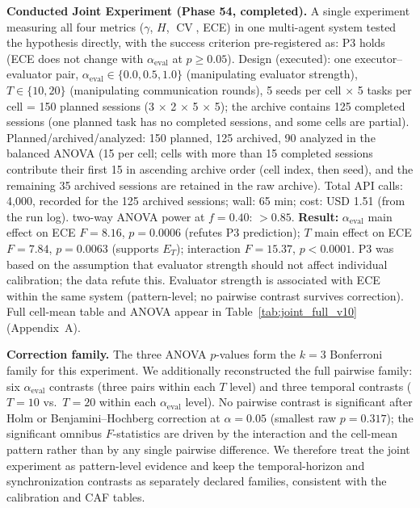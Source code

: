 \documentclass[11pt]{article}
\DeclareMathOperator{\CV}{CV}
\begin{document}
\textbf{Conducted Joint Experiment (Phase 54, completed).} A single experiment measuring all four metrics ($\gamma$, $H$, $\CV$, ECE) in one multi-agent system tested the hypothesis directly, with the success criterion pre-registered as: P3 holds (ECE does not change with $\alpha_{\text{eval}}$ at $p \geq 0.05$). Design (executed): one executor--evaluator pair, $\alpha_{\text{eval}} \in \{0.0, 0.5, 1.0\}$ (manipulating evaluator strength), $T \in \{10, 20\}$ (manipulating communication rounds), 5 seeds per cell $\times$ 5 tasks per cell = 150 planned sessions (3 $\times$ 2 $\times$ 5 $\times$ 5); the archive contains 125 completed sessions (one planned task has no completed sessions, and some cells are partial). Planned/archived/analyzed: 150 planned, 125 archived, 90 analyzed in the balanced ANOVA (15 per cell; cells with more than 15 completed sessions contribute their first 15 in ascending archive order (cell index, then seed), and the remaining 35 archived sessions are retained in the raw archive). Total API calls: 4{,}000, recorded for the 125 archived sessions; wall: 65 min; cost: USD 1.51 (from the run log). two-way ANOVA power at $f = 0.40$: $> 0.85$. \textbf{Result:} $\alpha_{\text{eval}}$ main effect on ECE $F = 8.16$, $p = 0.0006$ (refutes P3 prediction); $T$ main effect on ECE $F = 7.84$, $p = 0.0063$ (supports $E_T$); interaction $F = 15.37$, $p < 0.0001$. P3 was based on the assumption that evaluator strength should not affect individual calibration; the data refute this. Evaluator strength is associated with ECE within the same system (pattern-level; no pairwise contrast survives correction). Full cell-mean table and ANOVA appear in Table~\ref{tab:joint_full_v10} (Appendix~A).

\textbf{Correction family.} The three ANOVA $p$-values form the $k{=}3$ Bonferroni family for this experiment. We additionally reconstructed the full pairwise family: six $\alpha_{\text{eval}}$ contrasts (three pairs within each $T$ level) and three temporal contrasts ($T{=}10$ vs.\ $T{=}20$ within each $\alpha_{\text{eval}}$ level). No pairwise contrast is significant after Holm or Benjamini--Hochberg correction at $\alpha{=}0.05$ (smallest raw $p = 0.317$); the significant omnibus $F$-statistics are driven by the interaction and the cell-mean pattern rather than by any single pairwise difference. We therefore treat the joint experiment as pattern-level evidence and keep the temporal-horizon and synchronization contrasts as separately declared families, consistent with the calibration and CAF tables.
\end{document}
